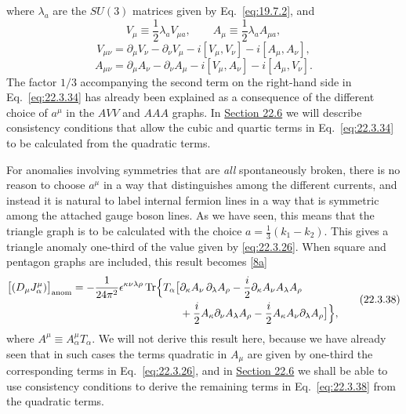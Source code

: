 where $\lambda_a$ are the $SU(3)$ matrices given by
Eq.~\eqref{eq:19.7.2}, and
\begin{equation}
 V_\mu\equiv\frac12\lambda_a V_{\mu a},
 \qquad
 A_\mu\equiv\frac12\lambda_a A_{\mu a},
 \tag{22.3.35}\label{eq:22.3.35}
\end{equation}
\begin{equation}
 V_{\mu\nu}
 =\partial_\mu V_\nu-\partial_\nu V_\mu
 -i[V_\mu,V_\nu]-i[A_\mu,A_\nu],
 \tag{22.3.36}\label{eq:22.3.36}
\end{equation}
\begin{equation}
 A_{\mu\nu}
 =\partial_\mu A_\nu-\partial_\nu A_\mu
 -i[V_\mu,A_\nu]-i[A_\mu,V_\nu].
 \tag{22.3.37}\label{eq:22.3.37}
\end{equation}
The factor $1/3$ accompanying the second term on the right-hand side in
Eq.~\eqref{eq:22.3.34} has already been explained as a consequence of the
different choice of $a^\mu$ in the $AVV$ and $AAA$ graphs. In
\hyperref[sec:22.6]{Section 22.6} we will describe consistency conditions
that allow the cubic and quartic terms in Eq.~\eqref{eq:22.3.34} to be
calculated from the quadratic terms.

For anomalies involving symmetries that are \emph{all} spontaneously
broken, there is no reason to choose $a^\mu$ in a way that distinguishes
among the different currents, and instead it is natural to label internal
fermion lines in a way that is symmetric among the attached gauge boson
lines. As we have seen, this means that the triangle graph is to be
calculated with the choice $a=\frac13(k_1-k_2)$. This gives a triangle
anomaly one-third of the value given by \eqref{eq:22.3.26}. When square and
pentagon graphs are included, this result becomes
\hyperref[ch22-ref-8a]{[8a]}
\begin{equation}
 \begin{aligned}
 \bigl[(D_\mu J_\alpha^\mu)\bigr]_{\mathrm{anom}}
 =-\frac{1}{24\pi^2}\epsilon^{\kappa\nu\lambda\rho}
 \operatorname{Tr}\Bigl\{T_\alpha\bigl[
 &\partial_\kappa A_\nu\,\partial_\lambda A_\rho
 -\frac{i}{2}\partial_\kappa A_\nu A_\lambda A_\rho
 \\
 &+\frac{i}{2}A_\kappa\partial_\nu A_\lambda A_\rho
 -\frac{i}{2}A_\kappa A_\nu\partial_\lambda A_\rho
 \bigr]\Bigr\},
 \end{aligned}
 \tag{22.3.38}\label{eq:22.3.38}
\end{equation}
where $A^\mu\equiv A_\alpha^\mu T_\alpha$. We will not derive this result
here, because we have already seen that in such cases the terms quadratic
in $A_\mu$ are given by one-third the corresponding terms in
Eq.~\eqref{eq:22.3.26}, and in \hyperref[sec:22.6]{Section 22.6} we shall
be able to use consistency conditions to derive the remaining terms in
Eq.~\eqref{eq:22.3.38} from the quadratic terms.

